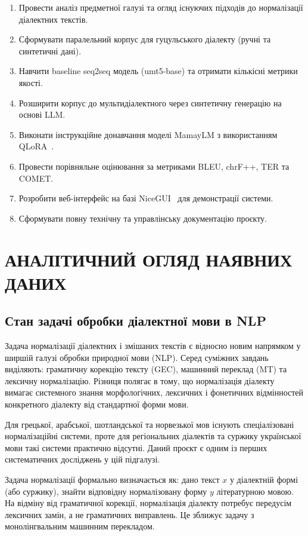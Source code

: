 \documentclass[14pt]{extarticle}
\begin{document}
\begin{enumerate}
  \item Провести аналіз предметної галузі та огляд існуючих підходів до нормалізації діалектних текстів.
  \item Сформувати паралельний корпус для гуцульського діалекту (ручні та синтетичні дані).
  \item Навчити baseline seq2seq модель (umt5-base) та отримати кількісні метрики якості.
  \item Розширити корпус до мульти\-діалектного через синтетичну генерацію на основі LLM.
  \item Виконати інструкційне донавчання моделі MamayLM з використанням QLoRA~\cite{qlora}.
  \item Провести порівняльне оцінювання за метриками BLEU, chrF++, TER та COMET.
  \item Розробити веб-інтерфейс на базі NiceGUI~\cite{hf_transformers} для демонстрації системи.
  \item Сформувати повну технічну та управлінську документацію проєкту.
\end{enumerate}

\clearpage

\section{АНАЛІТИЧНИЙ ОГЛЯД НАЯВНИХ ДАНИХ}

\subsection{Стан задачі обробки діалектної мови в NLP}

Задача нормалізації діалектних і змішаних текстів є відносно новим напрямком у ширшій галузі обробки природної мови (NLP). Серед суміжних завдань виділяють: граматичну корекцію тексту (GEC), машинний переклад (MT) та лексичну нормалізацію. Різниця полягає в тому, що нормалізація діалекту вимагає системного знання морфологічних, лексичних і фонетичних відмінностей конкретного діалекту від стандартної форми мови.

Для грецької, арабської, шотландської та норвезької мов існують спеціалізовані нормалізаційні системи, проте для регіональних діалектів та суржику української мови такі системи практично відсутні. Даний проєкт є одним із перших систематичних досліджень у цій підгалузі.

Задача нормалізації формально визначається як: дано текст $x$ у діалектній формі (або суржику), знайти відповідну нормалізовану форму $y$ літературною мовою. На відміну від граматичної корекції, нормалізація діалекту потребує передусім лексичних замін, а не граматичних виправлень. Це зближує задачу з монолінгвальним машинним перекладом.
\end{document}
